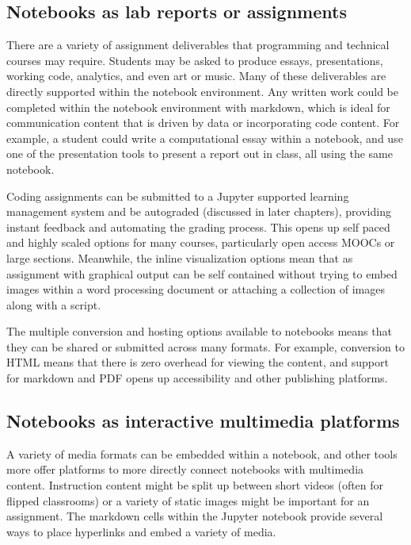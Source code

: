\documentclass[]{book}
\begin{document}
\subsection{Notebooks as lab reports or
assignments}\label{notebooks-as-lab-reports-or-assignments}

There are a variety of assignment deliverables that programming and
technical courses may require. Students may be asked to produce essays,
presentations, working code, analytics, and even art or music. Many of
these deliverables are directly supported within the notebook
environment. Any written work could be completed within the notebook
environment with markdown, which is ideal for communication content that
is driven by data or incorporating code content. For example, a student
could write a computational essay within a notebook, and use one of the
presentation tools to present a report out in class, all using the same
notebook.

Coding assignments can be submitted to a Jupyter supported learning
management system and be autograded (discussed in later chapters),
providing instant feedback and automating the grading process. This
opens up self paced and highly scaled options for many courses,
particularly open access MOOCs or large sections. Meanwhile, the inline
visualization options mean that as assignment with graphical output can
be self contained without trying to embed images within a word
processing document or attaching a collection of images along with a
script.

The multiple conversion and hosting options available to notebooks means
that they can be shared or submitted across many formats. For example,
conversion to HTML means that there is zero overhead for viewing the
content, and support for markdown and PDF opens up accessibility and
other publishing platforms.

\subsection{Notebooks as interactive multimedia
platforms}\label{notebooks-as-interactive-multimedia-platforms}

A variety of media formats can be embedded within a notebook, and other
tools more offer platforms to more directly connect notebooks with
multimedia content. Instruction content might be split up between short
videos (often for flipped classrooms) or a variety of static images
might be important for an assignment. The markdown cells within the
Jupyter notebook provide several ways to place hyperlinks and embed a
variety of media.
\end{document}
